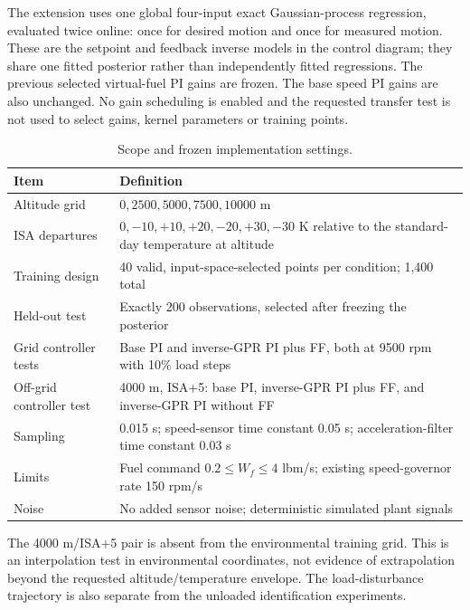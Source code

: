 The extension uses one global four-input exact Gaussian-process regression, evaluated twice online: once for desired motion and once for measured motion. These are the setpoint and feedback inverse models in the control diagram; they share one fitted posterior rather than independently fitted regressions. The previous selected virtual-fuel PI gains are frozen. The base speed PI gains are also unchanged. No gain scheduling is enabled and the requested transfer test is not used to select gains, kernel parameters or training points.

\begin{table}[H]\centering\small
\begin{tabularx}{\linewidth}{@{}lX@{}}\toprule Item & Definition\\\midrule
Altitude grid & $0,2500,5000,7500,10000$ m\\
ISA departures & $0,-10,+10,+20,-20,+30,-30$ K relative to the standard-day temperature at altitude\\
Training design & 40 valid, input-space-selected points per condition; 1,400 total\\
Held-out test & Exactly 200 observations, selected after freezing the posterior\\
Grid controller tests & Base PI and inverse-GPR PI plus FF, both at 9500 rpm with 10\% load steps\\
Off-grid controller test & 4000 m, ISA+5: base PI, inverse-GPR PI plus FF, and inverse-GPR PI without FF\\
Sampling & 0.015 s; speed-sensor time constant 0.05 s; acceleration-filter time constant 0.03 s\\
Limits & Fuel command $0.2\leq W_f\leq4$ lbm/s; existing speed-governor rate 150 rpm/s\\
Noise & No added sensor noise; deterministic simulated plant signals\\\bottomrule
\end{tabularx}\caption{Scope and frozen implementation settings.}\end{table}

The 4000 m/ISA+5 pair is absent from the environmental training grid. This is an interpolation test in environmental coordinates, not evidence of extrapolation beyond the requested altitude/temperature envelope. The load-disturbance trajectory is also separate from the unloaded identification experiments.

